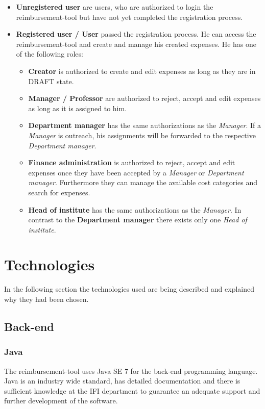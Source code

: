 \begin{itemize}
    \item \textbf{Unregistered user} are users, who are authorized to login the reimbursement-tool but have not yet completed the registration process.
    \item \textbf{Registered user / User} passed the registration process. He can access the reimbursement-tool and create and manage his created expenses. He has one of the following roles:

    \begin{itemize}
        \item \textbf{Creator} is authorized to create and edit expenses as long as they are in DRAFT state.

        \item \textbf{Manager / Professor} are authorized to reject, accept and edit expenses as long as it is assigned to him.

        \item \textbf{Department manager} has the same authorizations as the \textit{Manager}. If a \textit{Manager} is outreach, his assignments will be forwarded to the respective \textit{Department manager}.

        \item \textbf{Finance administration} is authorized to reject, accept and edit expenses once they have been accepted by a \textit{Manager} or \textit{Department manager}. Furthermore they can manage the available cost categories and search for expenses.

        \item \textbf{Head of institute} has the same authorizations as the \textit{Manager}. In contrast to the \textbf{Department manager} there exists only one \textit{Head of institute}.
    \end{itemize}
\end{itemize}


\section{Technologies}

In the following section the technologies used are being described and explained why they had been chosen.

\subsection{Back-end}

\subsubsection{Java}
The reimbursement-tool uses Java SE 7 for the back-end programming language. Java is an industry wide standard, has detailed documentation and there is sufficient knowledge at the IFI department to guarantee an adequate support and further development of the software.

